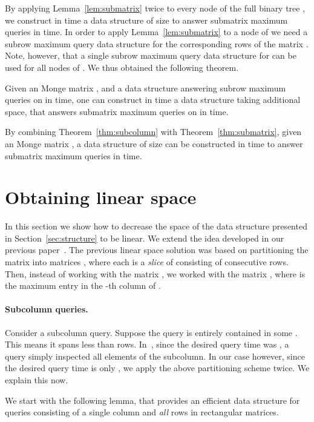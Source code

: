 \documentclass{llncs}
\begin{document}
By applying Lemma~\ref{lem:submatrix} twice to every node of the full binary tree ,
we construct in  time a data structure of size  to
answer submatrix maximum queries in  time. In
order to apply Lemma~\ref{lem:submatrix} to a node of  we
need a subrow maximum query data structure for the corresponding rows
of the matrix . Note, however, that a single subrow maximum query
data structure for  can be used for all nodes of . We
thus obtained the following theorem.

\begin{theorem}
\label{thm:submatrix}
Given an  Monge matrix , and a data structure 
answering subrow maximum queries on  in  time, one can
construct in  time  a data structure
taking 
additional space, that answers submatrix maximum queries on  in  time.
\end{theorem}

By combining Theorem~\ref{thm:subcolumn} with Theorem~\ref{thm:submatrix},
given an  Monge matrix , a data structure of size  can be
constructed in  time to answer submatrix maximum queries in
 time.



\section{Obtaining linear space}
\label{sec:linear}
In this section we show how to decrease the space of the data structure presented in Section~\ref{sec:structure} to be linear.
We extend the idea developed in our previous paper~\cite{ourICALP}.
The previous linear space solution was based on partitioning the matrix   into  matrices , where each  is a {\em slice} of  consisting of  consecutive rows. 
Then, instead of working with the matrix , we worked with the  matrix , where  is the maximum entry in the -th column of .


\paragraph{\bf Subcolumn queries.}
Consider a subcolumn query. Suppose the query is entirely contained in some . This means it spans less than  rows. In~\cite{ourICALP}, since the desired query time was , a query  simply inspected all elements of the subcolumn. In our case however, since the desired query time is only , 
we apply the above partitioning scheme twice. We explain this now.

We start with the following lemma, that provides an efficient data structure for  queries consisting of a single column and {\em all} rows in rectangular matrices.
\end{document}
